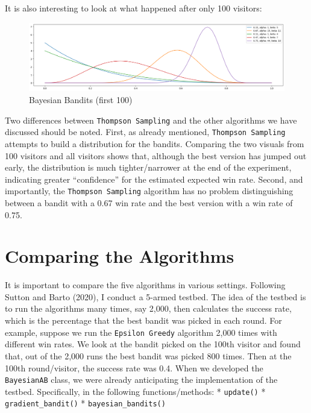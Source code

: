 \documentclass[
]{book}
\theoremstyle{definition}
\theoremstyle{definition}
\theoremstyle{definition}
\theoremstyle{definition}
\theoremstyle{remark}
\begin{document}
It is also interesting to look at what happened after only 100 visitors:

\begin{figure}
\centering
\includegraphics{images/bb_100.png}
\caption{Bayesian Bandits (first 100)}
\end{figure}

Two differences between \texttt{Thompson\ Sampling} and the other algorithms we have discussed should be noted. First, as already mentioned, \texttt{Thompson\ Sampling} attempts to build a distribution for the bandits. Comparing the two visuals from 100 visitors and all visitors shows that, although the best version has jumped out early, the distribution is much tighter/narrower at the end of the experiment, indicating greater ``confidence'' for the estimated expected win rate. Second, and importantly, the \texttt{Thompson\ Sampling} algorithm has no problem distinguishing between a bandit with a 0.67 win rate and the best version with a win rate of 0.75.

\hypertarget{comparing-the-algorithms}{%
\section{Comparing the Algorithms}\label{comparing-the-algorithms}}

It is important to compare the five algorithms in various settings. Following Sutton and Barto (2020), I conduct a 5-armed testbed. The idea of the testbed is to run the algorithms many times, say 2,000, then calculates the success rate, which is the percentage that the best bandit was picked in each round. For example, suppose we run the \texttt{Epsilon\ Greedy} algorithm 2,000 times with different win rates. We look at the bandit picked on the 100th visitor and found that, out of the 2,000 runs the best bandit was picked 800 times. Then at the 100th round/visitor, the success rate was 0.4. When we developed the \texttt{BayesianAB} class, we were already anticipating the implementation of the testbed. Specifically, in the following functions/methods:
* \texttt{update()}
* \texttt{gradient\_bandit()}
* \texttt{bayesian\_bandits()}
\end{document}
